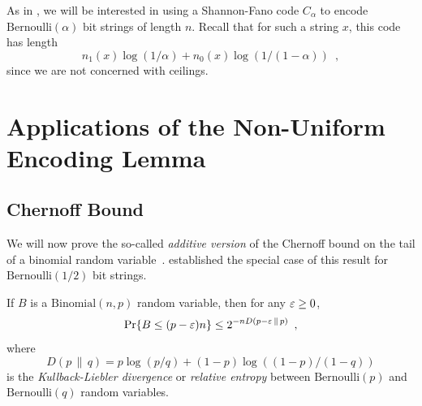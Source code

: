 \documentclass{patmorin}
\begin{document}
As in , we will be interested in using a
Shannon-Fano code $C_\alpha$ to encode $\mathrm{Bernoulli}(\alpha)$
bit strings of length $n$. Recall that for such a string $x$, this
code has length
\[
  n_1(x) \log (1/\alpha) + n_0(x) \log(1/(1 - \alpha)) \enspace ,
\]
since we are not concerned with ceilings.

\section{Applications of the Non-Uniform Encoding Lemma}

\subsection{Chernoff Bound}

We will now prove the so-called \emph{additive version} of the
Chernoff bound on the tail of a binomial random
variable~\cite{chernoff:bound}.  established
the special case of this result for $\mathrm{Bernoulli}(1/2)$ bit
strings.

\begin{thm}
  If $B$ is a $\mathrm{Binomial}(n,p)$ random variable, then for any
  $\varepsilon \geq 0$,
  \[
    \Pr\{B\le(p-\varepsilon)n\} \le 2^{-nD(p-\varepsilon \,\|\, p)} \enspace ,
  \]
  where 
  \[ 
    D(p\, \|\, q)= p\log (p/q) + (1-p)\log ((1 - p)/(1 - q))
  \]
  is the \emph{Kullback-Liebler divergence} or \emph{relative entropy}
  between $\mathrm{Bernoulli}(p)$ and $\mathrm{Bernoulli}(q)$ random
  variables.
\end{thm}
\end{document}
